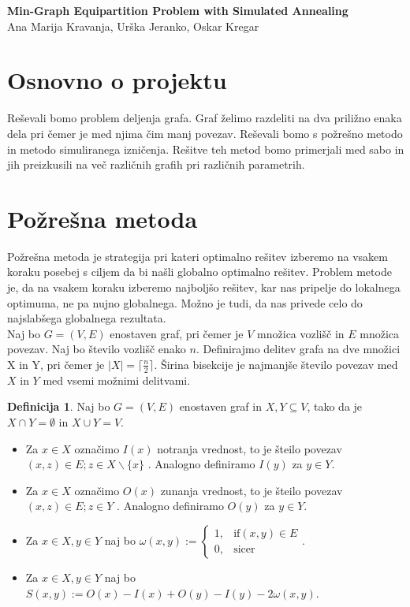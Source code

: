 \documentclass[12pt,a4paper]{amsart}
\theoremstyle{definition} %
\newtheorem{definicija}{Definicija}[section]
\theoremstyle{plain} %
\newcommand{\naslovdela}{Min-Graph Equipartition Problem with Simulated Annealing}
\newcommand{\letnica}{2019}
\begin{document}
\thispagestyle{empty}
\vfill

\begin{center}{\large
{\bf \naslovdela}\\[10mm]
Ana Marija Kravanja, Urška Jeranko, Oskar Kregar}\\[1cm]

\end{center}
\vfill

\noindent{\large
Ljubljana, \letnica}
\pagebreak


\section{Osnovno o projektu}
Reševali bomo problem deljenja grafa. Graf želimo razdeliti na dva priližno enaka dela pri čemer je med njima čim manj povezav.  Reševali bomo s požrešno metodo in metodo simuliranega izničenja. Rešitve teh metod bomo primerjali med sabo in jih preizkusili na več različnih grafih pri različnih parametrih. 

\section{Požrešna metoda}
Požrešna metoda je strategija pri kateri optimalno rešitev izberemo na vsakem koraku posebej s ciljem da bi našli globalno optimalno rešitev. Problem metode je, da na vsakem koraku izberemo najboljšo rešitev, kar nas pripelje do lokalnega optimuma, ne pa nujno globalnega. Možno je tudi, da nas privede celo do najslabšega globalnega rezultata. \\

Naj bo $G=(V,E)$ enostaven graf, pri čemer je $V$ množica vozlišč in $E$ množica povezav. Naj bo število vozlišč enako $n$. Definirajmo delitev grafa na dve množici X in Y, pri čemer je $|X| = \lceil \frac{n}{2} \rceil$. Širina bisekcije je najmanjše število povezav med $X$ in $Y$ med vsemi možnimi delitvami. 

\begin{definicija}
Naj bo $G=(V,E)$ enostaven graf in $X,Y \subseteq V$, tako da je $X \cap Y = \emptyset$ in $X \cup Y =V$.
\begin{itemize}
\item Za $x \in X$ označimo $I(x)$ notranja vrednost, to je šteilo povezav $(x,z) \in E;z\in X \backslash \{x\}$ . Analogno definiramo $I(y)$ za $y \in Y$.
\item Za $x \in X$ označimo $O(x)$ zunanja vrednost, to je šteilo povezav $(x,z) \in E;z\in Y $ . Analogno definiramo $O(y)$ za $y \in Y$.
\item Za $x \in X, y \in Y$ naj bo $\omega(x,y) := \begin{cases} 1,&\text{if} (x,y) \in E\\ 
0, &\text{sicer}\end{cases} $.
\item Za $x \in X, y \in Y$ naj bo $S(x,y):= O(x)-I(x)+O(y)-I(y)-2\omega(x,y)$.
\end{itemize}
\end{definicija}
\end{document}
